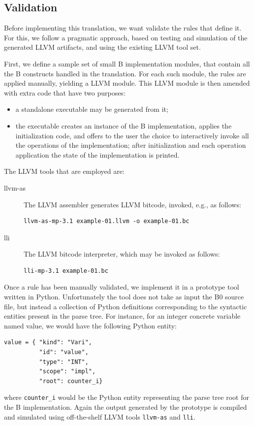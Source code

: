 \documentclass{llncs}
\newcommand{\B}[1]{\textsf{#1}}
\begin{document}
\begin{enumerate}
\section{Validation}
\label{sec:validation}

Before implementing this translation, we want validate the rules that define it.
For this, we follow a pragmatic approach, based on testing and simulation of the
generated LLVM artifacts, and using the existing LLVM tool set.  

First, we define a sample set of small B implementation modules, that contain
all the B constructs handled in the translation. For each such module, the rules
are applied manually, yielding a LLVM module. This LLVM module is then amended
with extra code that have two purposes:
\begin{itemize}
\item a standalone executable may be generated from it;
\item the executable creates an instance of the B implementation, applies the
  initialization code, and offers to the user the choice to interactively invoke
  all the operations of the implementation; after initialization and each
  operation application the state of the implementation is printed. 
\end{itemize}

The LLVM tools that are employed are:
\begin{description}
\item[llvm-as] The LLVM assembler generates LLVM bitcode, invoked, e.g., as
  follows:
\begin{verbatim}
llvm-as-mp-3.1 example-01.llvm -o example-01.bc
\end{verbatim}
\item[lli] The LLVM bitcode interpreter, which may be invoked as follows:
\begin{verbatim}
lli-mp-3.1 example-01.bc
\end{verbatim}
\end{description}

Once a rule has been manually validated, we implement it in a prototype tool
written in Python. Unfortunately the tool does not take as input the B0 source
file, but instead a collection of Python definitions corresponding to the
syntactic entities present in the parse tree. For instance, for an integer
concrete variable named \B{value}, we would have the following Python entity:
\begin{verbatim}
value = { "kind": "Vari",
          "id": "value",
          "type": "INT",
          "scope": "impl",
          "root": counter_i}
\end{verbatim}
where \verb'counter_i' would be the Python entity representing the parse tree
root for the B implementation. Again the output generated by the prototype
is compiled and simulated using off-the-shelf LLVM tools \verb'llvm-as' and
\verb'lli'.


\end{enumerate}
\end{document}
